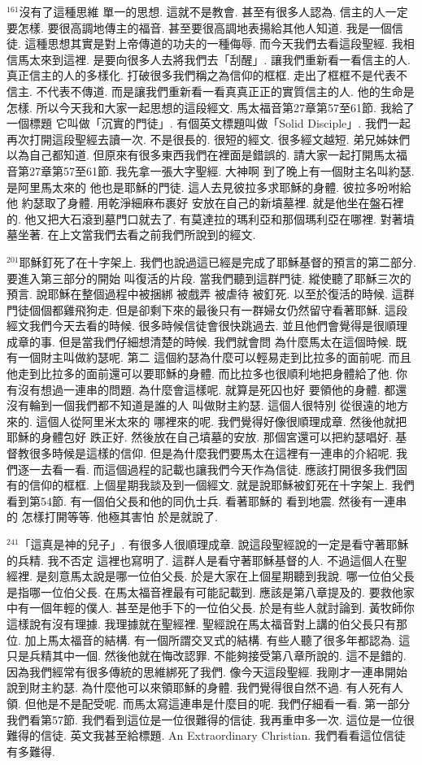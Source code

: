 \documentclass{book}
\begin{document}
$^{161}$沒有了這種思維 單一的思想.
這就不是教會.
甚至有很多人認為.
信主的人一定要怎樣.
要很高調地傳主的福音.
甚至要很高調地表揚給其他人知道.
我是一個信徒.
這種思想其實是對上帝傳道的功夫的一種侮辱.
而今天我們去看這段聖經.
我相信馬太來到這裡.
是要向很多人去將我們去「刮醒」.
讓我們重新看一看信主的人.
真正信主的人的多樣化.
打破很多我們稱之為信仰的框框.
走出了框框不是代表不信主.
不代表不傳道.
而是讓我們重新看一看真真正正的實質信主的人.
他的生命是怎樣.
所以今天我和大家一起思想的這段經文.
馬太福音第27章第57至61節.
我給了一個標題 它叫做「沉實的門徒」.
有個英文標題叫做「Solid Disciple」.
我們一起再次打開這段聖經去讀一次.
不是很長的.
很短的經文.
很多經文越短.
弟兄姊妹們以為自己都知道.
但原來有很多東西我們在裡面是錯誤的.
請大家一起打開馬太福音第27章第57至61節.
我先拿一張大字聖經.
大神啊 到了晚上有一個財主名叫約瑟.
是阿里馬太來的 他也是耶穌的門徒.
這人去見彼拉多求耶穌的身體.
彼拉多吩咐給他 約瑟取了身體.
用乾淨細麻布裹好 安放在自己的新墳墓裡.
就是他坐在盤石裡的.
他又把大石滾到墓門口就去了.
有莫達拉的瑪利亞和那個瑪利亞在哪裡.
對著墳墓坐著.
在上文當我們去看之前我們所說到的經文.

$^{201}$耶穌釘死了在十字架上.
我們也說過這已經是完成了耶穌基督的預言的第二部分.
要進入第三部分的開始 叫復活的片段.
當我們聽到這群門徒.
縱使聽了耶穌三次的預言.
說耶穌在整個過程中被捆綁 被戲弄 被虐待 被釘死.
以至於復活的時候.
這群門徒個個都雞飛狗走.
但是卻剩下來的最後只有一群婦女仍然留守看著耶穌.
這段經文我們今天去看的時候.
很多時候信徒會很快跳過去.
並且他們會覺得是很順理成章的事.
但是當我們仔細想清楚的時候.
我們就會問 為什麼馬太在這個時候.
既有一個財主叫做約瑟呢.
第二 這個約瑟為什麼可以輕易走到比拉多的面前呢.
而且他走到比拉多的面前還可以要耶穌的身體.
而比拉多也很順利地把身體給了他.
你有沒有想過一連串的問題.
為什麼會這樣呢.
就算是死囚也好 要領他的身體.
都還沒有輪到一個我們都不知道是誰的人 叫做財主約瑟.
這個人很特別 從很遠的地方來的.
這個人從阿里米太來的 哪裡來的呢.
我們覺得好像很順理成章.
然後他就把耶穌的身體包好 跌正好.
然後放在自己墳墓的安放.
那個宮還可以把約瑟唱好.
基督教很多時候是這樣的信仰.
但是為什麼我們要馬太在這裡有一連串的介紹呢.
我們逐一去看一看.
而這個過程的記載也讓我們今天作為信徒.
應該打開很多我們固有的信仰的框框.
上個星期我談及到一個經文.
就是說耶穌被釘死在十字架上.
我們看到第54節.
有一個伯父長和他的同仇士兵.
看著耶穌的 看到地震.
然後有一連串的 怎樣打開等等.
他極其害怕 於是就說了.

$^{241}$「這真是神的兒子」.
有很多人很順理成章.
說這段聖經說的一定是看守著耶穌的兵精.
我不否定 這裡也寫明了.
這群人是看守著耶穌基督的人.
不過這個人在聖經裡.
是刻意馬太說是哪一位伯父長.
於是大家在上個星期聽到我說.
哪一位伯父長是指哪一位伯父長.
在馬太福音裡最有可能記載到.
應該是第八章提及的.
要救他家中有一個年輕的僕人.
甚至是他手下的一位伯父長.
於是有些人就討論到.
黃牧師你這樣說有沒有理據.
我理據就在聖經裡.
聖經說在馬太福音對上講的伯父長只有那位.
加上馬太福音的結構.
有一個所謂交叉式的結構.
有些人聽了很多年都認為.
這只是兵精其中一個.
然後他就在悔改認罪.
不能夠接受第八章所說的.
這不是錯的.
因為我們經常有很多傳統的思維綁死了我們.
像今天這段聖經.
我剛才一連串開始說到財主約瑟.
為什麼他可以來領耶穌的身體.
我們覺得很自然不過.
有人死有人領.
但他是不是配受呢.
而馬太寫這連串是什麼目的呢.
我們仔細看一看.
第一部分我們看第57節.
我們看到這位是一位很難得的信徒.
我再重申多一次.
這位是一位很難得的信徒.
英文我甚至給標題.
An Extraordinary Christian.
我們看看這位信徒有多難得.
\end{document}
